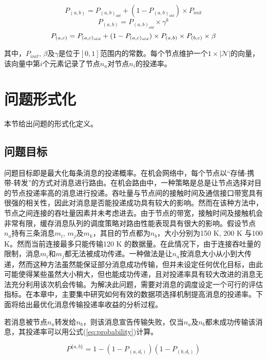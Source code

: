 \begin{equation}
P_{(a,b)}=P_{(a,b)_{old}}+(1-P_{(a,b)_{old}})\times P_{init}
\label{eq:prophet1}
\end{equation}
\begin{equation}
P_{(a,b)}=P_{(a,b)_{old}}\times\gamma^{k}
\label{eq:prophet2}
\end{equation}
\begin{equation}
P_{(a,c)}=P_{(a,c)_{old}}+(1-P_{(a,c)_{old}})\\
\times P_{(a,b)}\times P_{(b,c)}\times \beta
\label{eq:prophet3}
\end{equation}

其中，$P_{init}$, $\beta$及$\gamma$是位于$[0,1]$范围内的常数。每个节点维护一个$1\times|\mathcal{N}|$的向量，该向量中第$i$个元素记录了节点$n_a$对节点$n_i$的投递率。

\section{问题形式化}
\label{chap4:问题形式化}

本节给出问题的形式化定义。

\subsection{问题目标}
问题目标即是最大化每条消息的投递概率。在机会网络中，每个节点以“存储-携带-转发”的方式对消息进行路由。在机会路由中，一种策略是总是让节点选择对目的节点投递率高的消息进行投递。吞吐量与节点间的接触时间及通信接口带宽具有很强的相关性，因此对消息是否能投递成功具有较大的影响。然而在该种方法中，节点之间连接的吞吐量因素并未考虑进去。由于节点的带宽，接触时间及接触机会非常有限，缓存消息队列的调度策略对路由性能表现具有很大的影响。假设节点$n_a$持有三条消息$m_i$, $m_j$及$m_k$，其目的节点都为$n_b$，大小分别为150 K, 200 K 与100 K。然而当前连接最多只能传输120 K 的数据量。在此情况下，由于连接吞吐量的限制，消息$m_i$和$m_j$都无法被成功传递。一种做法是让$n_a$按消息大小从小到大传递，然而这种方法虽然能保证部分消息成功传输，但并未设定任何优化目标，由此可能使得某些虽然大小稍大，但也能成功传递，且对投递率具有较大改进的消息无法充分利用该次机会传输。为解决此问题，需要对消息的调度设定一个可行的评估指标。在本章中，主要集中研究如何有效的数据项选择机制提高消息的投递率。下面将给出最优化消息传输投递率收益的分析过程。

若消息被节点$n_a$转发给$n_b$，则该消息宣告传输失败，仅当$n_a$及$n_b$都未成功传输该消息，其投递率可以用公式(\ref{eq:probability})计算。

\begin{equation}
P^{\{a,b\}}=1-(1-P_{(a,d_i)})(1-P_{(b,d_i)})
\label{eq:probability}
\end{equation}

